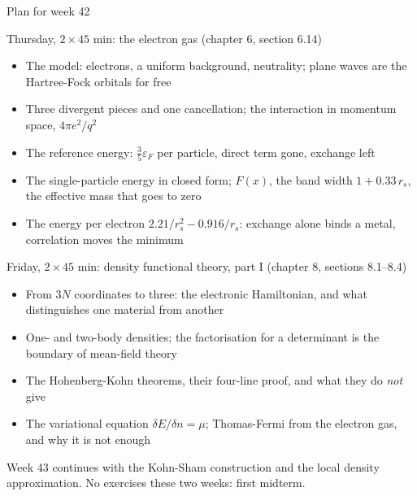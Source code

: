 \documentclass[aspectratio=169,10pt]{beamer}
\begin{document}
\begin{frame}[shrink=5]{Plan for week 42}
  \begin{block}{Thursday, $2\times45$ min: the electron gas (chapter 6, section 6.14)}
    \begin{itemize}
      \item The model: electrons, a uniform background, neutrality; plane waves are the Hartree-Fock orbitals for free
      \item Three divergent pieces and one cancellation; the interaction in momentum space, $4\pi e^2/q^2$
      \item The reference energy: $\tfrac35\varepsilon_F$ per particle, direct term gone, exchange left
      \item The single-particle energy in closed form; $F(x)$, the band width $1+0.33\,r_s$, the effective mass that goes to zero
      \item The energy per electron $2.21/r_s^2-0.916/r_s$: exchange alone binds a metal, correlation moves the minimum
    \end{itemize}
  \end{block}
  \begin{block}{Friday, $2\times45$ min: density functional theory, part I (chapter 8, sections 8.1--8.4)}
    \begin{itemize}
      \item From $3N$ coordinates to three: the electronic Hamiltonian, and what distinguishes one material from another
      \item One- and two-body densities; the factorisation for a determinant is the boundary of mean-field theory
      \item The Hohenberg-Kohn theorems, their four-line proof, and what they do \emph{not} give
      \item The variational equation $\delta E/\delta n=\mu$; Thomas-Fermi from the electron gas, and why it is not enough
    \end{itemize}
  \end{block}
  \centering\small Week 43 continues with the Kohn-Sham construction and the local density approximation. No exercises these two weeks: first midterm.
\end{frame}
\end{document}
